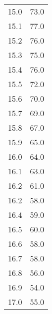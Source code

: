 \begin{table}
\begin{tabular}{S S }
15.0  & 73.0\\ 
15.1  & 77.0\\ 
15.2  & 76.0\\ 
15.3  & 75.0\\ 
15.4  & 76.0\\ 
15.5  & 72.0\\ 
15.6  & 70.0\\ 
15.7  & 69.0\\ 
15.8  & 67.0\\ 
15.9  & 65.0\\ 
16.0  & 64.0\\ 
16.1  & 63.0\\ 
16.2  & 61.0\\ 
16.2  & 58.0\\ 
16.4  & 59.0\\ 
16.5  & 60.0\\ 
16.6  & 58.0\\ 
16.7  & 58.0\\ 
16.8  & 56.0\\ 
16.9  & 54.0\\ 
17.0  & 55.0\\ 
\bottomrule 
\end{tabular} 
\end{table}